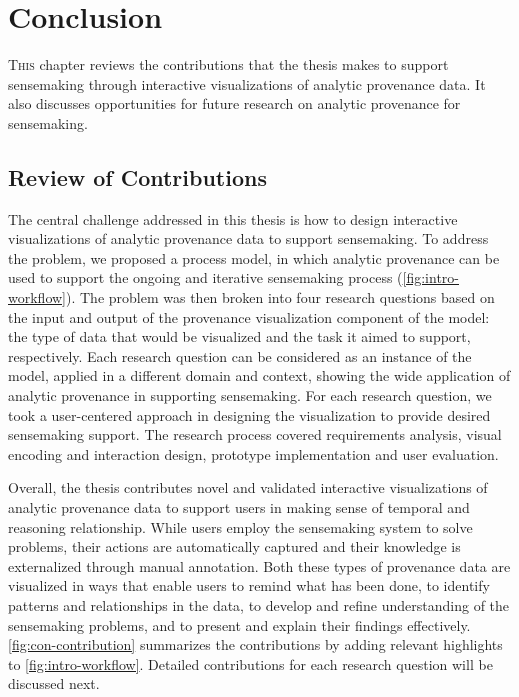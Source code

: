 \chapter{Conclusion}
\label{chap:conclusion}

\graphicspath{{Chapter7/figures/}}

\lettrine{T}{his} chapter reviews the contributions that the thesis makes to support sensemaking through interactive visualizations of analytic provenance data. It also discusses opportunities for future research on analytic provenance for sensemaking.

\section{Review of Contributions}
The central challenge addressed in this thesis is how to design interactive visualizations of analytic provenance data to support sensemaking. To address the problem, we proposed a process model, in which analytic provenance can be used to support the ongoing and iterative sensemaking process (\autoref{fig:intro-workflow}). The problem was then broken into four research questions based on the input and output of the provenance visualization component of the model: the type of data that would be visualized and the task it aimed to support, respectively. Each research question can be considered as an instance of the model, applied in a different domain and context, showing the wide application of analytic provenance in supporting sensemaking. For each research question, we took a user-centered approach in designing the visualization to provide desired sensemaking support. The research process covered requirements analysis, visual encoding and interaction design, prototype implementation and user evaluation.

Overall, the thesis contributes novel and validated interactive visualizations of analytic provenance data to support users in making sense of temporal and reasoning relationship. While users employ the sensemaking system to solve problems, their actions are automatically captured and their knowledge is externalized through manual annotation. Both these types of provenance data are visualized in ways that enable users to remind what has been done, to identify patterns and relationships in the data, to develop and refine understanding of the sensemaking problems, and to present and explain their findings effectively. \autoref{fig:con-contribution} summarizes the contributions by adding relevant highlights to \autoref{fig:intro-workflow}. Detailed contributions for each research question will be discussed next.

